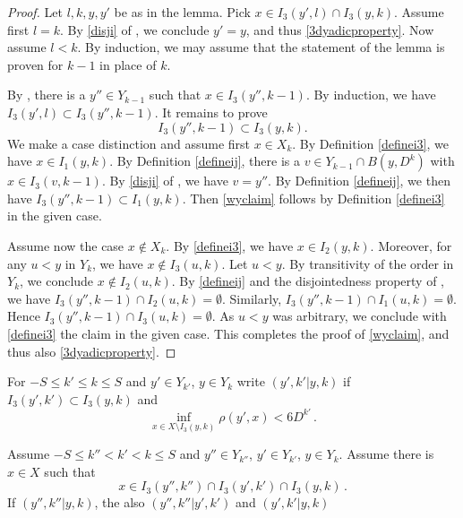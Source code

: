 \begin{proof}
\leanok
Let $l,k,y,y'$ be as in the lemma. Pick $x\in I_3(y',l)\cap I_3(y,k)$. Assume first $l=k$. By \eqref{disji} of , we conclude $y'=y$, and thus \eqref{3dyadicproperty}. Now assume $l<k$. By induction, we may assume that the statement of the lemma is proven for $k-1$ in place of $k$.

By , there is a $y''\in Y_{k-1}$ such that $x\in I_3(y'',k-1)$. By induction, we have $I_3(y',l)\subset I_3(y'',k-1)$. It remains to prove
\begin{equation}\label{wyclaim}
I_3(y'',k-1)\subset I_3(y,k).
\end{equation}
We make a case distinction and assume first $x\in X_k$. By Definition \eqref{definei3}, we have $x\in I_1(y,k)$. By Definition \eqref{defineij}, there is a $v\in Y_{k-1}\cap B(y,D^k)$ with $x\in I_3(v,k-1)$. By \eqref{disji} of , we have $v=y''$. By Definition \eqref{defineij}, we then have $I_3(y'',k-1)\subset I_1(y,k)$. Then \eqref{wyclaim} follows by Definition \eqref{definei3} in the given case.

Assume now the case $x\notin X_k$. By \eqref{definei3}, we have $x\in I_2(y,k)$. Moreover, for any $u<y$ in $Y_k$, we have $x\not\in I_3(u,k)$. Let $u<y$. By transitivity of the order in $Y_k$, we conclude $x\not \in I_2(u,k)$. By \eqref{defineij} and the disjointedness property of , we have $I_3(y'',k-1)\cap I_2(u,k)= \emptyset$. Similarly, $I_3(y'',k-1)\cap I_1(u,k)= \emptyset$. Hence $I_3(y'',k-1)\cap I_3(u,k)=\emptyset$. As $u<y$ was arbitrary, we conclude with \eqref{definei3} the claim in the given case. This completes the proof of \eqref{wyclaim}, and thus also \eqref{3dyadicproperty}.
\end{proof}

For $-S\le k'\le k\le S$ and $y'\in Y_{k'}$, $y\in Y_k$
write $(y',k'|y,k)$ if $I_3(y',k')\subset I_3(y,k)$ and
\begin{equation}\label{bdcond}
    \inf_{x\in X\setminus I_3(y,k)}\rho(y',x)<6D^{k'}\, .
\end{equation}

\begin{lemma}
    \label{transitive-boundary}
    \leanok
    Assume $-S\le k''< k'< k\le S$ and
    $y''\in Y_{k''}$, $y'\in Y_{k'}$, $y\in Y_k$.
    Assume there is $x\in X$ such that
    \begin{equation}
    x\in I_3(y'',k'')\cap I_3(y',k')\cap I_3(y,k)\, .
    \end{equation}
    If $(y'',k''|y,k)$, the also
    $(y'',k''|y',k')$ and $(y',k'|y,k)$
\end{lemma}

